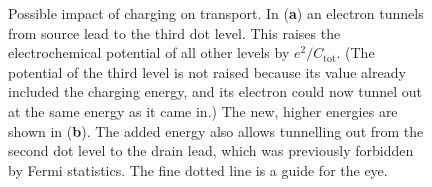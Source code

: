 \documentclass[a4paper,11pt]{article}
\begin{document}
\begin{figure}[p]
\begin{center}
{
        }
        \caption{Possible impact of charging on transport. In (\textbf{a}) an electron tunnels from source lead to the third dot level. This raises the electrochemical potential of all other levels by $e^2/C_\mathrm{tot}$. (The potential of the third level is not raised because its value already included the charging energy, and its electron could now tunnel out at the same energy as it came in.) The new, higher energies are shown in (\textbf{b}). The added energy also allows tunnelling out from the second dot level to the drain lead, which was previously forbidden by Fermi statistics. The fine dotted line is a guide for the eye.}
        \label{fig:Sequential_diagrams}
    \end{center}
    \end{figure}
\end{document}
